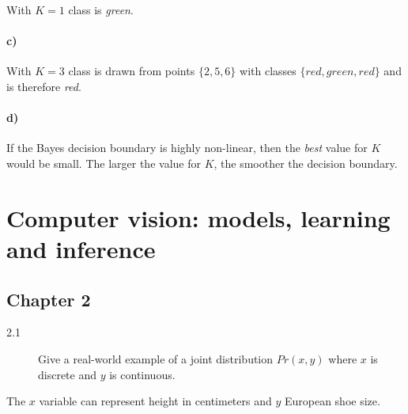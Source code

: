 \documentclass[10pt,a4paper]{article}
\newenvironment{prob}[1]%
   {%
    \begin{description}\item[#1]}%
   {\end{description}}
\begin{document}
With $K = 1$ class is \textit{green}.

\paragraph{c)}

With $K = 3$ class is drawn from points $\{2, 5, 6\}$ with classes
$\{red, green, red\}$ and is therefore \textit{red}.

\paragraph{d)}

If the Bayes decision boundary is highly non-linear, then the
\textit{best} value for $K$ would be small. The larger the value for
$K$, the smoother the decision boundary.

\section{Computer vision: models, learning and inference}

\subsection{Chapter 2}

\begin{prob}{2.1}
  Give a real-world example of a joint distribution $Pr(x, y)$ where
  $x$ is discrete and $y$ is continuous.
\end{prob}
The $x$ variable can represent height in centimeters and $y$ European shoe size.
\end{document}
